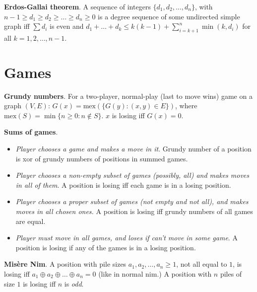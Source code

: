 \documentclass[a4paper, 12pt]{article}
\let\le=\leqslant
\let\ge=\geqslant
\newcommand{\Section}[1]{
  \section*{#1}
  \addcontentsline{toc}{subsection}{#1}
  \vspace{-3mm}
}
\newcommand{\Topic}[1]{\textbf{#1}}
\begin{document}

\Topic{Erdos-Gallai theorem}.
A sequence of integers $\{ d_1, d_2, \dots, d_n \}$,
with $n-1 \ge d_1 \ge d_2 \ge \dots \ge d_n \ge 0$ is a degree sequence
of some undirected simple graph iff $\sum d_i$ is even and
$d_1 + \dots + d_k \le k(k-1) + \sum_{i=k+1}^n \min(k, d_{i})$
for all $k=1,2,\dots,n-1$.



\Section{Games}

\Topic{Grundy numbers}.
For a two-player, normal-play (last to move wins) game on a graph $(V,E)$:
$G(x) = \mbox{mex}(\{ G(y) : (x, y) \in E \})$,
where $\mbox{mex}(S) = \min \{ n \ge 0: n \not\in S \}$.
$x$ is losing iff $G(x) = 0$.

\Topic{Sums of games}.

\vspace{-4mm}
\begin{itemize}
  \item
    \emph{Player chooses a game and makes a move in it}.
    Grundy number of a position is xor of grundy numbers of positions in summed games.
  \item
    \emph{Player chooses a non-empty subset of games (possibly, all) and makes moves in all of them}.
    A position is losing iff each game is in a losing position.
  \item
    \emph{Player chooses a proper subset of games (not empty and not all),
        and makes moves in all chosen ones.}
    A position is losing iff grundy numbers of all games are equal.
  \item
    \emph{Player must move in all games, and loses if can't move in some game}.
    A position is losing if any of the games is in a losing position.
\end{itemize}

\vspace{-3mm}

\Topic{Mis\`{e}re Nim}.
A position with pile sizes $a_1, a_2, \dots, a_n \ge 1$,
not all equal to $1$, is losing iff $a_1 \oplus a_2 \oplus \dots \oplus a_n = 0$
(like in normal nim.)
A position with $n$ piles of size $1$ is losing iff $n$ is \emph{odd}.
\end{document}
